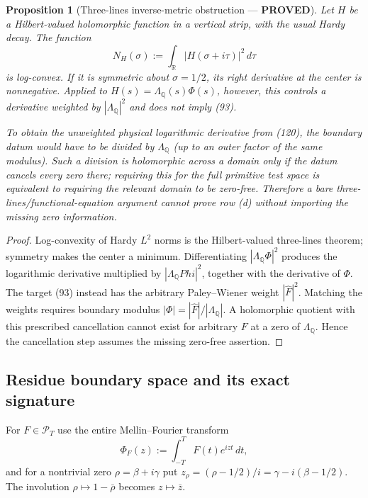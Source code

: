 \documentclass[11pt]{article}
\newtheorem{proposition}[theorem]{Proposition}
\newcommand{\PROVED}{\textcolor{green!45!black}{\textbf{PROVED}}}
\begin{document}
\begin{proposition}[Three-lines inverse-metric obstruction --- \PROVED]
Let $H$ be a Hilbert-valued holomorphic function in a vertical strip, with
the usual Hardy decay.  The function
\begin{equation}
 N_H(\sigma):=\int_{\mathbb R}|H(\sigma+i\tau)|^2\,d\tau \tag{120}
\end{equation}
is log-convex.  If it is symmetric about $\sigma=1/2$, its right derivative
at the center is nonnegative.  Applied to
$H(s)=\Lambda_{\mathbb Q}(s)\Phi(s)$, however, this controls a derivative
weighted by $|\Lambda_{\mathbb Q}|^2$ and does not imply (93).

To obtain the unweighted physical logarithmic derivative from (120), the
boundary datum would have to be divided by $\Lambda_{\mathbb Q}$ (up to an
outer factor of the same modulus).  Such a division is holomorphic across a
domain only if the datum cancels every zero there; requiring this for the
full primitive test space is equivalent to requiring the relevant domain to
be zero-free.  Therefore a bare three-lines/functional-equation argument
cannot prove row (d) without importing the missing zero information.
\end{proposition}

\begin{proof}
Log-convexity of Hardy $L^2$ norms is the Hilbert-valued three-lines theorem;
symmetry makes the center a minimum.  Differentiating
$|\Lambda_{\mathbb Q}\Phi|^2$ produces the logarithmic derivative multiplied
by $|\Lambda_{\mathbb Q}Phi|^2$, together with the derivative of $\Phi$.
The target (93) instead has the arbitrary Paley--Wiener weight
$|\widehat F|^2$.  Matching the weights requires boundary modulus
$|\Phi|=|\widehat F|/|\Lambda_{\mathbb Q}|$.  A holomorphic quotient with
this prescribed cancellation cannot exist for arbitrary $F$ at a zero of
$\Lambda_{\mathbb Q}$.  Hence the cancellation step assumes the missing
zero-free assertion.
\end{proof}

\subsection{Residue boundary space and its exact signature}

For $F\in\mathcal P_T$ use the entire Mellin--Fourier transform
\begin{equation}
 \Phi_F(z):=\int_{-T}^TF(t)e^{izt}\,dt,                \tag{121}
\end{equation}
and for a nontrivial zero $\rho=\beta+i\gamma$ put
$z_\rho=(\rho-1/2)/i=\gamma-i(\beta-1/2)$.  The involution
$\rho\mapsto1-\bar\rho$ becomes $z\mapsto\bar z$.
\end{document}
